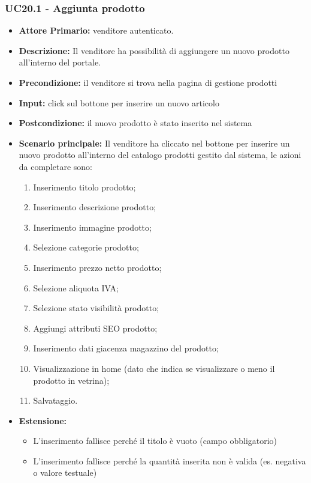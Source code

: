\subsubsection{UC20.1 - Aggiunta prodotto}
\label{UC20.1}
\begin{itemize}
    \item \textbf{Attore Primario:}  venditore autenticato.
    \item \textbf{Descrizione:} Il venditore ha possibilità di aggiungere un nuovo prodotto all’interno del portale.
    \item \textbf{Precondizione:} il venditore si trova nella pagina di gestione prodotti
    \item \textbf{Input:} click sul bottone per inserire un nuovo articolo
    \item \textbf{Postcondizione:} il nuovo prodotto è stato inserito nel sistema
    \item \textbf{Scenario principale:} Il venditore ha cliccato nel bottone per inserire un nuovo prodotto all’interno del catalogo prodotti gestito dal sistema, le azioni da completare sono: 
    \begin{enumerate}
        \item Inserimento titolo prodotto;
        \item Inserimento descrizione prodotto;
        \item Inserimento immagine prodotto;
        \item Selezione categorie prodotto;
        \item Inserimento prezzo netto prodotto;
        \item Selezione aliquota IVA;
        \item Selezione stato visibilità prodotto; 
        \item Aggiungi attributi SEO prodotto;
        \item Inserimento dati giacenza magazzino del prodotto;
        \item Visualizzazione in home (dato che indica se visualizzare o meno il prodotto in vetrina);
        \item Salvataggio.
    \end{enumerate}
    \item \textbf{Estensione:}
    \begin{itemize}
        \item L'inserimento fallisce perché il titolo è vuoto (campo obbligatorio) 
        \item L'inserimento fallisce perché la quantità inserita non è valida (es. negativa o valore testuale)
    \end{itemize}
\end{itemize}


